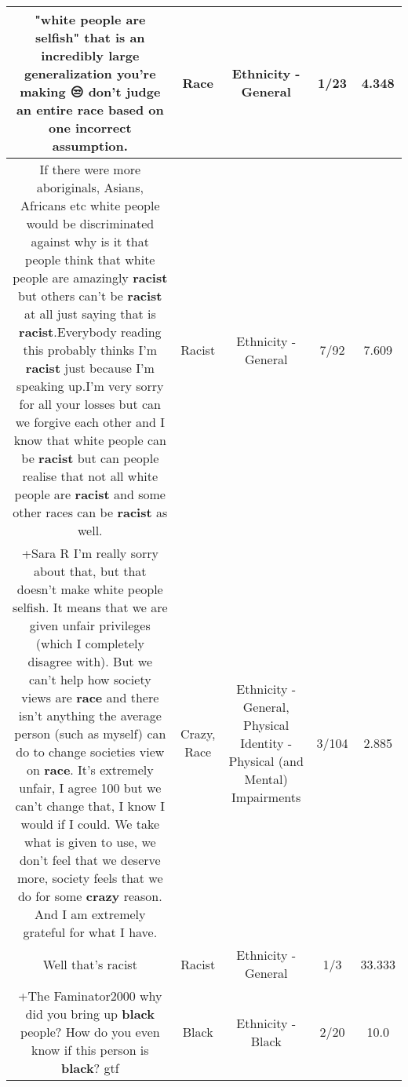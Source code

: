 \documentclass[11pt]{article}
\newlength\mylength
\begin{document}
\begin{center}
\begin{longtable}{|C{.65\mylength}|C{.30\mylength}|C{.12\mylength}|C{.12\mylength}|C{.12\mylength}|}
  \small "white people are selfish" that is an incredibly large generalization you're making 😒 don't judge an entire \textbf{race} based on one incorrect assumption.\normalsize   & Race & Ethnicity - General & 1/23 & 4.348 \\  \hline
  \small If there were more aboriginals, Asians, Africans etc white people would be discriminated against why is it that people think that white people are amazingly \textbf{racist} but others can't be \textbf{racist} at all just saying that is \textbf{racist}.Everybody reading this probably thinks I'm \textbf{racist} just because I'm speaking up.I'm very sorry for all your losses but can we forgive each other and I know that white people can be \textbf{racist} but can people realise that not all white people are \textbf{racist} and some other races can be \textbf{racist} as well.\normalsize   & Racist & Ethnicity - General & 7/92 & 7.609 \\  \hline
  \small +Sara R I'm really sorry about that, but that doesn't make white people selfish. It means that we are given unfair privileges (which I completely disagree with). But we can't help how society views are \textbf{race} and there isn't anything the average person (such as myself) can do to change societies view on \textbf{race}. It's extremely unfair, I agree 100 but we can't change that, I know I would if I could. We take what is given to use, we don't feel that we deserve more, society feels that we do for some \textbf{crazy} reason. And I am extremely grateful for what I have.\normalsize   & Crazy, Race & Ethnicity - General, Physical Identity - Physical (and Mental) Impairments & 3/104 & 2.885 \\  \hline
  \small Well that's racist\normalsize   & Racist & Ethnicity - General & 1/3 & 33.333 \\  \hline
  \small +The Faminator2000 why did you bring up \textbf{black} people? How do you even know if this person is \textbf{black}? gtf\normalsize   & Black & Ethnicity - Black & 2/20 & 10.0 \\  \hline

\end{longtable}
\end{center}
\end{document}
